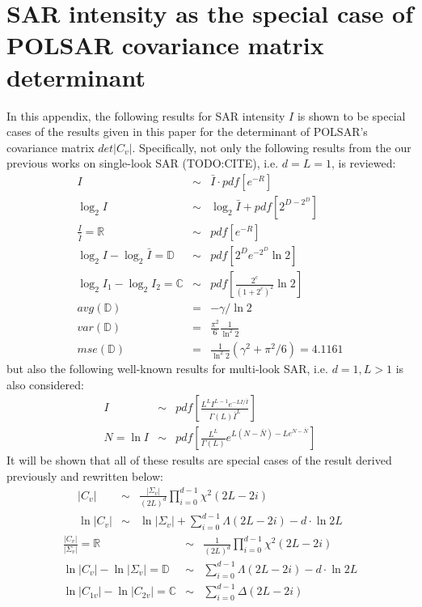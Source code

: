 \section{SAR intensity as the special case of POLSAR covariance matrix determinant}
\label{sec:appendix_sar_special_case_of_polsar}

In this appendix, the following results for SAR intensity $I$ is shown to be special cases of the results given in this paper for the determinant of POLSAR's covariance matrix $det|C_v|$.
Specifically, not only the following results from the our previous works on single-look SAR (TODO:CITE), i.e. $d=L=1$, is reviewed:
\begin{eqnarray}
  I &\sim& \bar{I} \cdot pdf \left[ e^{-R} \right] \\
  \log_2{I} &\sim& \log_2{\bar{I}} + pdf \left[ 2^{D-2^D} \right] \\
  \frac{I}{\bar{I}} = \mathbb{R} &\sim& pdf \left[ e^{-R} \right]  \\
  \log_2{I} - \log_2{\bar{I}} = \mathbb{D} &\sim& pdf \left[ 2^De^{-2^D}\ln2 \right]\\
  \log_2{I_1} - \log_2{I_2} = \mathbb{C} &\sim& pdf \left[ \frac{2^c}{(1+2^c)^2} \ln2 \right] \\
  avg(\mathbb{D}) &=& -\gamma / \ln{2} \\
  var(\mathbb{D}) &=& \frac{\pi^2}{6} \frac{1}{ \ln^2{2}} \\
  mse(\mathbb{D}) &=& \frac{1}{\ln^2{2}}( \gamma^2 + \pi^2/6 ) = 4.1161 
\end{eqnarray}
but also the following well-known results for multi-look SAR, i.e. $d=1,L>1$ is also considered:
  \begin{eqnarray}
I &\sim& pdf \left[ \frac{L^L I^{L-1} e^{-LI/\bar{I}}}{\Gamma(L) \bar{I}^L} \right] \\
N = \ln{I} &\sim& pdf \left[ \frac{L^L}{\Gamma(L)} e^{L(N-\bar{N})-Le^{N-\bar{N}}} \right]
  \end{eqnarray}
It will be shown that all of these results are special cases of the result derived previously and rewritten below:
\begin{eqnarray}
  |C_v| &\sim& \frac{|\Sigma_v|}{(2L)^d} \prod^{d-1}_{i=0} \chi^2(2L-2i)  \label{eqn:polsar_det_cov_dist} \\
  \ln{|C_v|} &\sim& \ln{|\Sigma_v|} + \sum^{d-1}_{i=0} \Lambda(2L-2i) - d \cdot \ln{2L} \label{eqn:polsar_log_det_cov_dist} 
\end{eqnarray}
\begin{eqnarray}
  \frac{|C_v|}{|\Sigma_v|} = \mathbb{R} &\sim& \frac{1}{(2L)^d} \prod^{d-1}_{i=0} \chi^2(2L-2i) \label{eqn:polsar_ratio_det_cov_dist} \\
  \ln{|C_v|} - \ln{|\Sigma_v|} = \mathbb{D} &\sim& \sum^{d-1}_{i=0} \Lambda(2L-2i) - d \cdot \ln{2L} \label{eqn:polsar_dispersion_log_det_cov_dist} \\ 
  \ln{|C_{1v}|} - \ln{|C_{2v}|} = \mathbb{C} &\sim& \sum^{d-1}_{i=0} \Delta(2L-2i)
\end{eqnarray}
